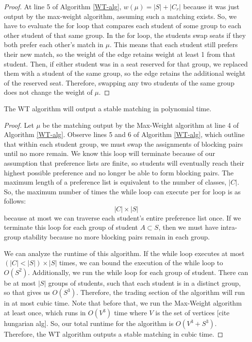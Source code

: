 \begin{proof}
  At line 5 of Algorithm \ref{WT-alg}, $w(\mu) = |S| + |C_r|$
  because it was just output by the max-weight algorithm, assuming such a
  matching exists. So, we have to
  evaluate the for loop that compares each student of some group to each other
  student of that same group. In the for loop, the students swap seats if they
  both prefer each other's match in $\mu$. This means that each student still
  prefers their new match, so the weight of the edge retains weight at least 1
  from that student. Then, if either student was in a seat reserved for that
  group, we replaced them with a student of the same group, so the edge retains the
  additional weight of the reserved seat. Therefore, swapping any two students of
  the same group does not change the weight of $\mu$.
\end{proof}

\begin{theorem}
  The WT algorithm will output a stable matching in
  polynomial time.
\end{theorem}

\begin{proof}
  Let $\mu$ be the matching output by the Max-Weight algorithm at
  line 4 of Algorithm \ref{WT-alg}. Observe lines 5 and 6 of Algorithm
  \ref{WT-alg}, which outline that within each student group, we must swap the
  assignments of blocking pairs until no more remain. We know this loop will
  terminate because of our assumption that preference lists are finite, so
  students will eventually reach their highest possible preference and no longer
  be able to form blocking pairs. The maximum length of a preference list is
  equivalent to the number of classes, $|C|$. So, the maximum number of times
  the while loop can execute per for loop is as follows: \[ |C| \times |S|\]
  because at most we can traverse each student's entire preference list once. If
  we terminate this loop for each group of student $A \subset S$, then we must have
  intra-group stability because no more blocking pairs remain in each group.

  We can analyze the runtime of this algorithm. If the while loop executes at
  most $(|C| < |S|) \times |S|$ times, we can bound the execution of the while
  loop to $O(S^2)$. Additionally, we run the while loop for each group of
  student. There can be at most $|S|$ groups of students, such that each student
  is in a distinct group, so that gives us $O(S^3)$. Therefore, the trading
  section of the algorithm will run in at most cubic time. Note that before
  that, we run the Max-Weight algorithm at least once, which runs in $O(V^3)$
  time where $V$ is the set of vertices [cite hungarian alg]. So, our total runtime for the algorithm
  is $O(V^3 + S^3)$.
  Therefore, the WT algorithm outputs a stable matching in cubic time.
\end{proof}

